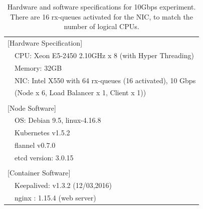 {
\setlength{\tabcolsep}{1em}
\renewcommand{\arraystretch}{1.2}

\begin{table}[h]
  \centering
  \begin{tabular}{ll}
    \hline 
    \multicolumn{2}{l}{[Hardware Specification]}   \\
    & CPU: Xeon E5-2450 2.10GHz x 8 (with Hyper Threading) \\
    & Memory: 32GB \\
    & NIC: Intel X550 with 64 rx-queues (16 activated), 10 Gbps \\
    & (Node x 6, Load Balancer x 1, Client x 1)) \\
    & \\
    \multicolumn{2}{l}{[Node Software]}  \\
    & OS: Debian 9.5, linux-4.16.8 \\
    & Kubernetes v1.5.2 \\
    & flannel v0.7.0 \\
    & etcd version: 3.0.15 \\
    & \\
    \multicolumn{2}{l}{[Container Software]}   \\
    & Keepalived: v1.3.2 (12/03,2016) \\
    & nginx : 1.15.4 (web server) \\
  \hline 
  \end{tabular}
  \par\bigskip
  \centering
  \begin{minipage}{0.9\columnwidth}
    \caption[Hardware and software specifications for 10Gbps experiment]{
      Hardware and software specifications for 10Gbps experiment.
      There are 16 rx-queues activated for the NIC, to match the number of logical CPUs.
    }
    \label{tab:hw_sw_spec_10g}
  \end{minipage}
\end{table}
}

